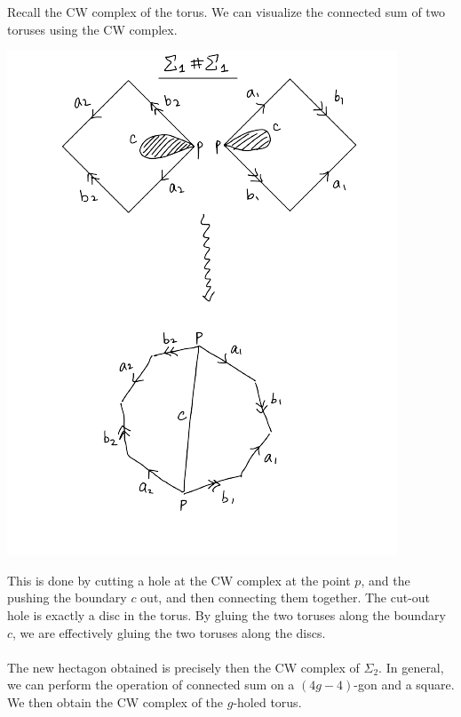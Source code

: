 \documentclass[a4paper]{article}
\begin{document}
Recall the CW complex of the torus. We can visualize the connected sum of two toruses using the CW complex. 

\begin{center}
\includegraphics[scale = 0.8]{Image 1}
\end{center}

This is done by cutting a hole at the CW complex at the point $p$, and the pushing the boundary $c$ out, and then connecting them together. The cut-out hole is exactly a disc in the torus. By gluing the two toruses along the boundary $c$, we are effectively gluing the two toruses along the discs. \\~\\

The new hectagon obtained is precisely then the CW complex of $\Sigma_2$. In general, we can perform the operation of connected sum on a $(4g-4)$-gon and a square. We then obtain the CW complex of the $g$-holed torus. 
\end{document}
